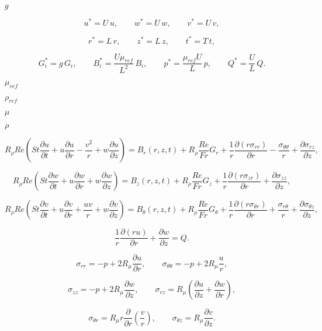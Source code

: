\documentclass{article}
\begin{document}
$ g $
\pagebreak

\[ u^* = U\, u, \qquad w^* = U\, w, \qquad v^* = U\, v, \]
\pagebreak

\[ r^* = L\, r, \qquad z^* = L\, z, \qquad t^* = T\, t, \]
\pagebreak

\[ G_i^* = g\, G_i, \qquad B_i^* = \frac{U\mu_{ref}}{L^2}\, B_i, \qquad p^* = \frac{\mu_{ref} U}{L}\, p, \qquad Q^* = \frac{U}{L}\, Q. \]
\pagebreak

$ \mu_{ref} $
\pagebreak

$ \rho_{ref} $
\pagebreak

$ \mu $
\pagebreak

$ \rho $
\pagebreak

\[ R_{\rho} Re\left(St\frac{\partial u}{\partial t} + {u}\frac{\partial u}{\partial r} - \frac{{v}^2}{r} + {w}\frac{\partial u}{\partial z} \right) = B_r\left(r,z,t\right)+ R_\rho \frac{Re}{Fr} G_r + \frac{1}{r} \frac{\partial\left({r}\sigma_{rr}\right)}{\partial r} - \frac{\sigma_{\theta\theta}}{r} + \frac{\partial\sigma_{rz}}{\partial z}, \]
\pagebreak

\[ R_{\rho} Re\left(St\frac{\partial w}{\partial t} + {u}\frac{\partial w}{\partial r} + {w}\frac{\partial w}{\partial z} \right) = B_z\left(r,z,t\right)+ R_\rho \frac{Re}{Fr} G_z+ \frac{1}{r}\frac{\partial\left({r}\sigma_{zr}\right)}{\partial r} + \frac{\partial\sigma_{zz}}{\partial z}, \]
\pagebreak

\[ R_{\rho} Re\left(St\frac{\partial v}{\partial t} + {u}\frac{\partial v}{\partial r} + \frac{u v}{r} +{w}\frac{\partial v}{\partial z} \right)= B_\theta\left(r,z,t\right)+ R_\rho \frac{Re}{Fr} G_\theta+ \frac{1}{r}\frac{\partial\left({r}\sigma_{\theta r}\right)}{\partial r} + \frac{\sigma_{r\theta}}{r} + \frac{\partial\sigma_{\theta z}}{\partial z}, \]
\pagebreak

\[ \frac{1}{r}\frac{\partial\left(ru\right)}{\partial r} + \frac{\partial w}{\partial z} = Q. \]
\pagebreak

\[ \sigma_{rr} = -p + 2R_\mu \frac{\partial u}{\partial r}, \qquad \sigma_{\theta\theta} = -p +2R_\mu \frac{u}{r}, \]
\pagebreak

\[ \sigma_{zz} = -p + 2R_\mu \frac{\partial w}{\partial z}, \qquad \sigma_{rz} = R_\mu \left(\frac{\partial u}{\partial z} + \frac{\partial w}{\partial r}\right), \]
\pagebreak

\[ \sigma_{\theta r} = R_\mu r \frac{\partial}{\partial r}\left(\frac{v}{r}\right), \qquad \sigma_{\theta z} = R_\mu \frac{\partial v}{\partial z}. \]
\pagebreak
\end{document}
